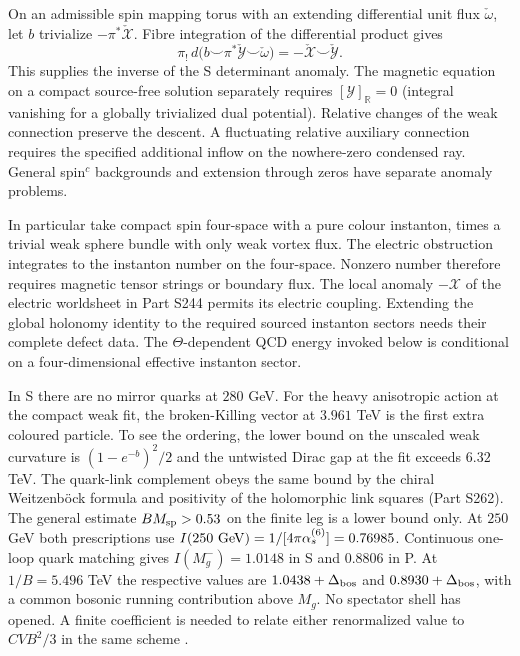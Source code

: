 \documentclass[aps,prd,reprint,onecolumn,nofootinbib,amsmath,amssymb]{revtex4-2}
\begin{document}
On an admissible spin mapping torus with an extending differential unit flux $\check\omega$, let $b$ trivialize $-\pi^*\check{\mathcal X}$. Fibre integration of the differential product gives
\begin{equation}
 \pi_!\,d\big(b\smile\pi^*\check{\mathcal Y}\smile\check\omega\big)
 =-\check{\mathcal X}\smile\check{\mathcal Y}.
\end{equation}
This supplies the inverse of the S determinant anomaly. The magnetic equation on a compact source-free solution separately requires $[\mathcal Y]_{\mathbb R}=0$ (integral vanishing for a globally trivialized dual potential). Relative changes of the weak connection preserve the descent. A fluctuating relative auxiliary connection requires the specified additional inflow on the nowhere-zero condensed ray. General spin$^c$ backgrounds and extension through zeros have separate anomaly problems.

In particular take compact spin four-space with a pure colour instanton, times a trivial weak sphere bundle with only weak vortex flux. The electric obstruction integrates to the instanton number on the four-space. Nonzero number therefore requires magnetic tensor strings or boundary flux. The local anomaly $-\mathcal X$ of the electric worldsheet in Part S244 permits its electric coupling. Extending the global holonomy identity to the required sourced instanton sectors needs their complete defect data. The $\Theta$-dependent QCD energy invoked below is conditional on a four-dimensional effective instanton sector.

In S there are no mirror quarks at $280$ GeV. For the heavy anisotropic action at the compact weak fit, the broken-Killing vector at $3.961$ TeV is the first extra coloured particle. To see the ordering, the lower bound on the unscaled weak curvature is $(1-e^{-b})^2/2$ and the untwisted Dirac gap at the fit exceeds $6.32$ TeV. The quark-link complement obeys the same bound by the chiral Weitzenb\"ock formula and positivity of the holomorphic link squares (Part S262). The general estimate $BM_{\rm sp}>0.53$ on the finite leg is a lower bound only. At $250$ GeV both prescriptions use $I(250~{\rm GeV})=1/[4\pi\alpha_s^{(6)}]=0.76985$. Continuous one-loop quark matching gives $I(M_g^-)=1.0148$ in S and $0.8806$ in P. At $1/B=5.496$ TeV the respective values are $1.0438+\Delta_{\rm bos}$ and $0.8930+\Delta_{\rm bos}$, with a common bosonic running contribution above $M_g$. No spectator shell has opened. A finite coefficient is needed to relate either renormalized value to $CVB^2/3$ in the same scheme \cite{TwoEndpoint2026}.
\end{document}
